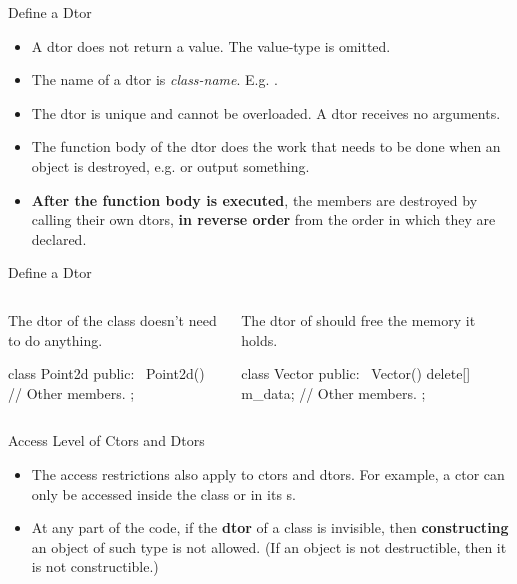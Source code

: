 \documentclass{beamer}
\begin{document}
\begin{frame}{Define a Dtor}
    \begin{itemize}
        \item A dtor does not return a value. The value-type is omitted.
        \item The name of a dtor is \ttt{\~}\textit{class-name}. E.g. .
        \item The dtor is unique and cannot be overloaded. A dtor receives no arguments.
        \item The function body of the dtor does the work that needs to be done when an object is destroyed, e.g.  or output something.
        \item \textbf{After the function body is executed}, the members are destroyed by calling their own dtors, \textbf{in reverse order} from the order in which they are declared.
    \end{itemize}
\end{frame}

\begin{frame}[fragile]{Define a Dtor}
    \begin{columns}
        \begin{column}{0.5\linewidth}
            The dtor of the  class doesn't need to do anything.
            \begin{cpp}
class Point2d {
 public:
  ~Point2d() {}
  // Other members.
};
            \end{cpp}
        \end{column}
        \begin{column}{0.5\linewidth}
            The dtor of  should free the memory it holds.
            \begin{cpp}
class Vector {
 public:
  ~Vector() { delete[] m_data; }
  // Other members.
};
            \end{cpp}
        \end{column}
    \end{columns}
\end{frame}

\begin{frame}{Access Level of Ctors and Dtors}
    \begin{itemize}
        \item The access restrictions also apply to ctors and dtors. For example, a  ctor can only be accessed inside the class or in its s.
        \item At any part of the code, if the \textbf{dtor} of a class is invisible, then \textbf{constructing} an object of such type is not allowed. (If an object is not destructible, then it is not constructible.)
    \end{itemize}
\end{frame}
\end{document}

